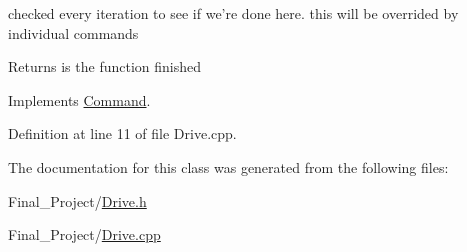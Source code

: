 checked every iteration to see if we're done here. this will be overrided by individual commands 

\begin{DoxyReturn}{Returns}
is the function finished 
\end{DoxyReturn}


Implements \hyperlink{classCommand_a9aa704d5f9d98f510a79e645701dc72a}{Command}.



Definition at line 11 of file Drive.\-cpp.



The documentation for this class was generated from the following files\-:\begin{DoxyCompactItemize}
\item 
Final\-\_\-\-Project/\hyperlink{Drive_8h}{Drive.\-h}\item 
Final\-\_\-\-Project/\hyperlink{Drive_8cpp}{Drive.\-cpp}\end{DoxyCompactItemize}
